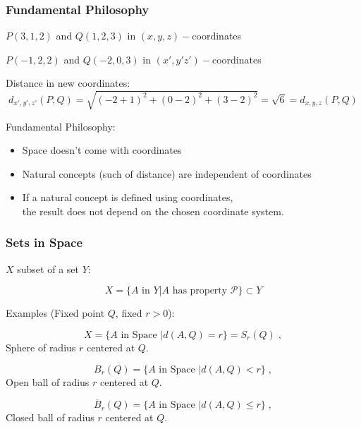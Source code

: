 \begin{frame}
 \frametitle{Fundamental Philosophy}
  $P(3,1,2)$ and $Q(1,2,3)$ in $(x,y,z)-$coordinates

  $P(-1,2,2)$ and $Q(-2,0,3)$ in $(x',y'z')-$coordinates

  Distance in new coordinates:
 \pause
%
$$d_{x',y',z'}(P,Q) = \sqrt{(-2+1)^2+(0-2)^2+(3-2)^2} = \sqrt{6} = d_{x,y,z}(P,Q)$$

Fundamental Philosophy:\pause
\begin{itemize}
 \item Space doesn't come with coordinates
  \item Natural concepts (such of distance) are independent of coordinates
  \item If a natural concept is defined using coordinates, \\
          the result does not depend on the chosen coordinate system.
\end{itemize}


\end{frame}

\begin{frame}
  \frametitle{Sets in Space}

  $X$ subset of a set $Y$:

  $$X = \{ A \text{ in } Y | A \text{ has property } \mathcal{P} \} \subset Y$$

\pause
Examples  (Fixed point $Q$, fixed $r>0$):

$$X = \{ A \text{ in Space } | d(A,Q) = r \} = S_r(Q)\; ,$$
\pause Sphere of radius $r$ centered at $Q$.\pause

$$B_r(Q) = \{ A \text{ in Space } | d(A,Q) <r \} \; ,$$
\pause  Open ball of radius $r$ centered at $Q$. \pause

$$\overline{B}_r(Q) = \{ A \text{ in Space } | d(A,Q) \leqslant r\} \; ,$$
\pause  Closed ball of radius $r$ centered at $Q$.

\end{frame}

